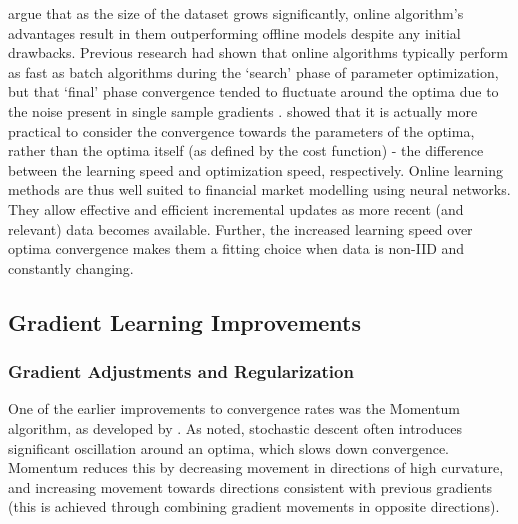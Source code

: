 \documentclass[a4paper,11pt,oneside]{article}
\theoremstyle{plain}
\theoremstyle{definition}
\begin{document}
	\citet{Bottou} argue that as the size of the dataset grows significantly, online algorithm's advantages result in 
	them outperforming offline models despite any initial drawbacks. Previous research had shown that online 
	algorithms typically perform as fast as batch algorithms during the `search' phase of parameter optimization, but 
	that `final' phase convergence tended to fluctuate around the optima due to the noise present in single sample 
	gradients \citep{LeCun, Bottou2}. \citet{Bottou} showed that it is actually more practical to consider the convergence towards
	the parameters of the optima, rather than the optima itself (as defined by the cost function) - the difference 
	between the learning speed and optimization speed, respectively. Online learning methods are thus well suited to financial market modelling using neural networks. They allow effective and efficient incremental updates as more recent (and relevant) data 
	becomes available. Further, the increased learning speed over optima convergence makes them a fitting choice when data is non-IID and 
	constantly changing.

	
	
	
	\subsection{Gradient Learning Improvements}\label{lr_grad_improv}
	
	\subsubsection{Gradient Adjustments and Regularization}
	
	One of the earlier improvements to convergence rates was the Momentum algorithm, as developed by \citet{Tseng}. 
	As noted, stochastic descent often introduces significant oscillation around an optima, which slows down 
	convergence. Momentum reduces this by decreasing movement in directions of high curvature, and  
	increasing movement towards directions consistent with previous gradients (this is achieved through combining 
	gradient movements in opposite directions).
	\hfill\break
	
\end{document}
